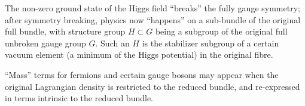 \begin{itemize}
	The non-zero ground state of the Higgs field ``breaks'' the fully gauge symmetry;
	after symmetry breaking, physics now ``happens'' on a sub-bundle of the original full bundle,
	with structure group $H \subset G$ being a subgroup of the original full unbroken gauge group $G$.
	Such an $H$ is the stabilizer subgroup of a certain vacuum element (a minimum of the Higgs potential)
	in the original fibre.
	
	``Mass'' terms for fermions and certain gauge bosons may appear
	when the original Lagrangian density is restricted to the reduced bundle,
	and re-expressed in terms intrinsic to the reduced bundle.
\end{itemize}


